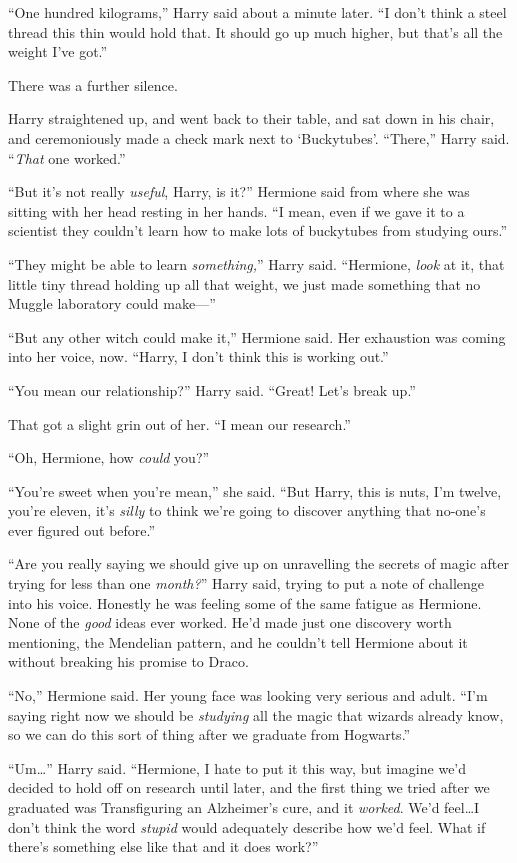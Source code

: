 “One hundred kilograms,” Harry said about a minute later. “I don’t think a steel thread this thin would hold that. It should go up much higher, but that’s all the weight I’ve got.”

There was a further silence.

Harry straightened up, and went back to their table, and sat down in his chair, and ceremoniously made a check mark next to ‘Buckytubes’. “There,” Harry said. “\emph{That} one worked.”

“But it’s not really \emph{useful}, Harry, is it?” Hermione said from where she was sitting with her head resting in her hands. “I mean, even if we gave it to a scientist they couldn’t learn how to make lots of buckytubes from studying ours.”

“They might be able to learn \emph{something,}” Harry said. “Hermione, \emph{look} at it, that little tiny thread holding up all that weight, we just made something that no Muggle laboratory could make—”

“But any other witch could make it,” Hermione said. Her exhaustion was coming into her voice, now. “Harry, I don’t think this is working out.”

“You mean our relationship?” Harry said. “Great! Let’s break up.”

That got a slight grin out of her. “I mean our research.”

“Oh, Hermione, how \emph{could} you?”

“You’re sweet when you’re mean,” she said. “But Harry, this is nuts, I’m twelve, you’re eleven, it’s \emph{silly} to think we’re going to discover anything that no-one’s ever figured out before.”

“Are you really saying we should give up on unravelling the secrets of magic after trying for less than one \emph{month?}” Harry said, trying to put a note of challenge into his voice. Honestly he was feeling some of the same fatigue as Hermione. None of the \emph{good} ideas ever worked. He’d made just one discovery worth mentioning, the Mendelian pattern, and he couldn’t tell Hermione about it without breaking his promise to Draco.

“No,” Hermione said. Her young face was looking very serious and adult. “I’m saying right now we should be \emph{studying} all the magic that wizards already know, so we can do this sort of thing after we graduate from Hogwarts.”

“Um…” Harry said. “Hermione, I hate to put it this way, but imagine we’d decided to hold off on research until later, and the first thing we tried after we graduated was Transfiguring an Alzheimer’s cure, and it \emph{worked}. We’d feel…I don’t think the word \emph{stupid} would adequately describe how we’d feel. What if there’s something else like that and it does work?”

